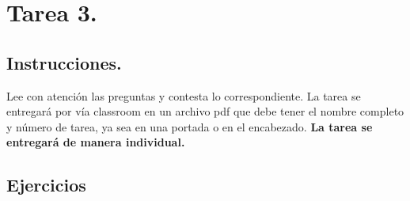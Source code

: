 \documentclass[12pt]{article}
\begin{document}

{\color{blue} \section*{Tarea 3.}}

{\color{blue} \subsection*{Instrucciones.}}
\vspace{0.5em} 

Lee con atención las preguntas y contesta lo correspondiente. La tarea se entregará por vía classroom
en un archivo pdf que debe tener el nombre completo y número de tarea, ya sea en una portada o en el encabezado.
\textbf{La tarea se entregará de manera individual.}\\

{\color{blue} \subsection*{Ejercicios}}
\vspace{0.5em}
\end{document}
